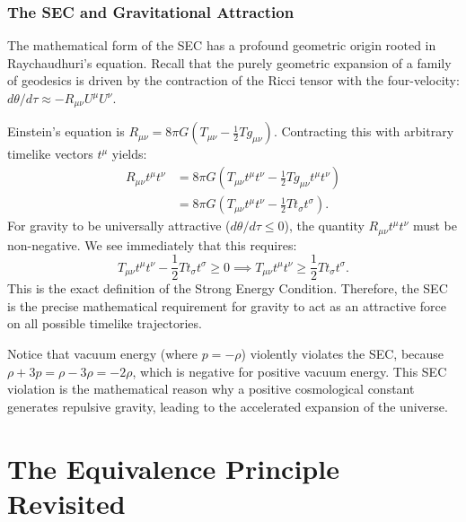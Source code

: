 \documentclass[11pt, a4paper]{report}
\begin{document}

\subsubsection*{The SEC and Gravitational Attraction}
The mathematical form of the SEC has a profound geometric origin rooted in Raychaudhuri's equation. Recall that the purely geometric expansion of a family of geodesics is driven by the contraction of the Ricci tensor with the four-velocity: $d\theta/d\tau \approx -R_{\mu\nu} U^{\mu} U^{\nu}$.

Einstein's equation is $R_{\mu\nu} = 8\pi G(T_{\mu\nu} - \frac{1}{2}T g_{\mu\nu})$. Contracting this with arbitrary timelike vectors $t^{\mu}$ yields:
\begin{align}
R_{\mu\nu} t^{\mu} t^{\nu} &= 8\pi G \left( T_{\mu\nu} t^{\mu} t^{\nu} - \frac{1}{2} T g_{\mu\nu} t^{\mu} t^{\nu} \right) \nonumber \\
&= 8\pi G \left( T_{\mu\nu} t^{\mu} t^{\nu} - \frac{1}{2} T t_{\sigma} t^{\sigma} \right).
\end{align}
For gravity to be universally attractive ($d\theta/d\tau \le 0$), the quantity $R_{\mu\nu}t^{\mu}t^{\nu}$ must be non-negative. We see immediately that this requires:
\begin{equation}
T_{\mu\nu} t^{\mu} t^{\nu} - \frac{1}{2} T t_{\sigma} t^{\sigma} \ge 0 \implies T_{\mu\nu} t^{\mu} t^{\nu} \ge \frac{1}{2} T t_{\sigma} t^{\sigma}.
\end{equation}
This is the exact definition of the Strong Energy Condition. Therefore, the SEC is the precise mathematical requirement for gravity to act as an attractive force on all possible timelike trajectories. 

Notice that vacuum energy (where $p = -\rho$) violently violates the SEC, because $\rho + 3p = \rho - 3\rho = -2\rho$, which is negative for positive vacuum energy. This SEC violation is the mathematical reason why a positive cosmological constant generates repulsive gravity, leading to the accelerated expansion of the universe.


\section{The Equivalence Principle Revisited}
\end{document}
